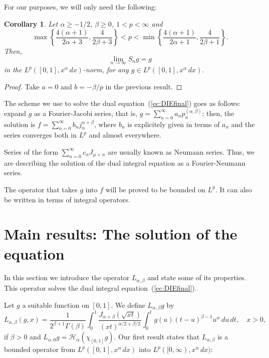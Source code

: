 \documentclass[12pt,leqno]{amsart}
\theoremstyle{plain}
\newtheorem{Cor}[Thm]{Corollary} %
\newcommand{\htra}{\mathcal{H}_\alpha} %
\newcommand{\ab}{{(\alpha,\beta)}} %
\begin{document}
For our purposes, we will only need the following:

\begin{Cor}
\label{cor:convja}
Let $\alpha \ge -1/2$, $\beta \ge 0$, $1<p<\infty$ and
\begin{equation*}
    \max{\left\{ \frac{4(\alpha+1)}{2\alpha+3}, \frac4{2\beta+3} \right\}}
    < p <
    \min{\left\{ \frac{4(\alpha+1)}{2\alpha+1}, \frac4{2\beta+1} \right\}}.
\end {equation*}
Then,
\begin{equation*}
    \lim_{n\to \infty}S_ng = g
\end{equation*}
in the $L^p([0,1],x^{\alpha}\,dx)$-norm, for any $g \in
L^p([0,1],x^\alpha\,dx)$.
\end{Cor}
\begin{proof}
Take $a = 0$ and $b = -\beta/p$ in the previous result.
\end{proof}

The scheme we use to solve the dual equation~(\ref{ec:DIEfinal}) goes as
follows: expand $g$ as a Fourier-Jacobi series, that is, $g =
\sum_{n=0}^\infty a_n p_n^\ab$; then, the solution is $f =
\sum_{n=0}^\infty b_n j_n^{\alpha+\beta}$, where $b_n$ is explicitely given
in terms of $a_n$ and the series converges both in $L^p$ and almost
everywhere.

Series of the form $\sum_{n=0}^\infty c_n J_{\mu+n}$ are usually known as
Neumann series. Thus, we are describing the solution of the dual integral
equation as a Fourier-Neumann series.

The operator that takes $g$ into $f$ will be proved to be bounded
on $L^p$. It can also be written in terms of integral operators.

\section{Main results: The solution of the equation}
\label{sec:solution}

In this section we introduce the operator $L_{\alpha,\beta}$
and state some of its properties. This operator solves
the dual integral equation~(\ref{ec:DIEfinal}).

Let $g$ a suitable function on $[0,1]$. We define $L_{\alpha,\beta}g$ by
\begin{equation*}
    L_{\alpha,\beta}(g,x) = \frac{1}{2^{\beta+1}\Gamma(\beta)}
    \int_0^1 \frac{J_{\alpha+\beta}(\sqrt{xt})}{(xt)^{{\alpha/2+\beta}/2}}
    \int_0^t g(u)(t-u)^{\beta-1}u^{\alpha}\,du \,dt,
    \quad x>0,
\end{equation*}
if $\beta > 0$ and $L_{\alpha,0}g = \htra(\chi_{[0,1]} g)$. Our first result
states that $L_{\alpha,\beta}$ is a bounded operator from $L^p([0,1],
x^\alpha \, dx)$ into $L^p([0,\infty), x^\alpha \, dx)$:
\end{document}

